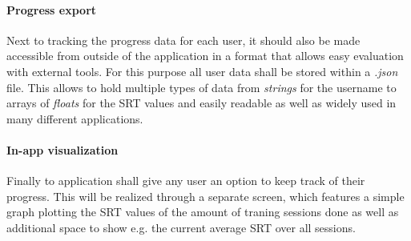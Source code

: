 \documentclass[a4paper,11pt]{article}%
\renewcommand{\\}{\vspace*{0.5\baselineskip} \newline}
\begin{document}
\paragraph{Progress export} Next to tracking the progress data for each user, it should also be made accessible from outside of the application in a format that allows easy evaluation with external tools. For this purpose all user data shall be stored within a \textit{.json} file. This allows to hold multiple types of data from \textit{strings} for the username to arrays of \textit{floats} for the \ac{SRT} values and easily readable as well as widely used in many different applications.


\paragraph{In-app visualization} Finally to application shall give any user an option to keep track of their progress. This will be realized through a separate screen, which features a simple graph plotting the \ac{SRT} values of the amount of traning sessions done as well as additional space to show e.g. the current average \ac{SRT} over all sessions.


\end{document}
